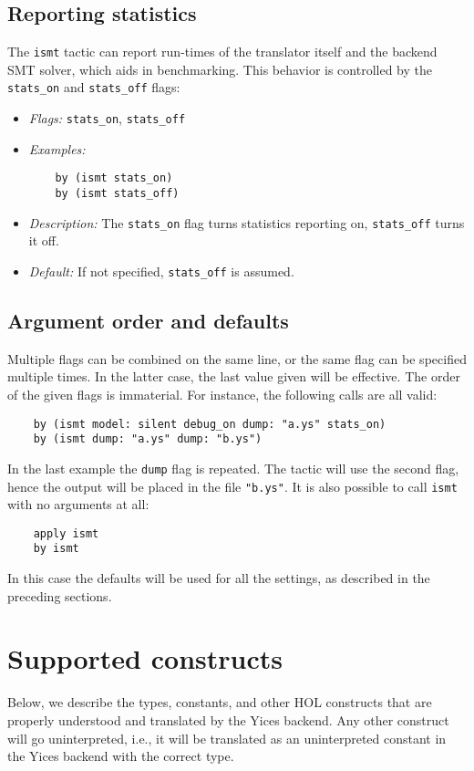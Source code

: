 \documentclass{article}
\begin{document}
\subsection{Reporting statistics}
The {\tt ismt} tactic can report run-times of the translator itself and the backend SMT
solver, which
aids in benchmarking. This behavior is controlled by the {\tt stats\_on} and {\tt stats\_off} flags:
\begin{itemize}
\item {\em Flags:} {\tt stats\_on}, {\tt stats\_off}
\item {\em Examples:} 
\begin{verbatim}
    by (ismt stats_on)
    by (ismt stats_off)
\end{verbatim}
\item {\em Description:} The {\tt stats\_on} flag turns statistics reporting on, {\tt stats\_off}
turns it off. 
\item {\em Default:} If not specified, {\tt stats\_off} is assumed. 
\end{itemize}

\subsection{Argument order and defaults}

Multiple flags can be combined on the same line, or the same flag can be specified multiple times. In the latter
case, the last value given will be effective. The order of the given flags is immaterial. For instance, the following
calls are all valid:

\begin{verbatim}
    by (ismt model: silent debug_on dump: "a.ys" stats_on)
    by (ismt dump: "a.ys" dump: "b.ys")
\end{verbatim}

In the last example the {\tt dump} flag is repeated. The tactic
will use the second flag, hence the output will be placed in the file {\tt "b.ys"}.
It is also possible to call {\tt ismt} with no arguments at all:

\begin{verbatim}
    apply ismt
    by ismt
\end{verbatim}

\noindent In this case the defaults will be used for all the settings, as described
in the preceding sections.

\section{Supported constructs}
Below, we describe the types, constants, and other HOL constructs that are
properly understood and translated by the Yices backend. Any other construct will
go uninterpreted, i.e., it will be translated as an uninterpreted constant in the Yices
backend with the correct type.
\end{document}
